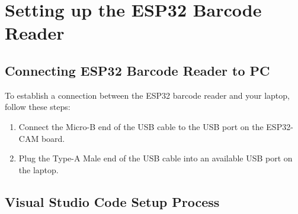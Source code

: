 %
%
%



	

\chapter{Setting up the ESP32 Barcode Reader}

\section{Connecting ESP32 Barcode Reader to PC}
To establish a connection between the ESP32 barcode reader and your laptop, follow these steps:

\begin{enumerate}
    \item Connect the Micro-B end of the USB cable to the USB port on the ESP32-CAM board.
    \item Plug the Type-A Male end of the USB cable into an available USB port on the laptop.
\end{enumerate}

\section{Visual Studio Code Setup Process}

